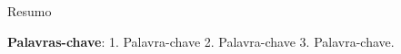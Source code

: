 \setlength{\absparsep}{18pt} %
\begin{resumo}
	
	Resumo
	
	\vspace{\onelineskip}
	
	\textbf{Palavras-chave}: 1. Palavra-chave  2. Palavra-chave 3. Palavra-chave.
	
\end{resumo}